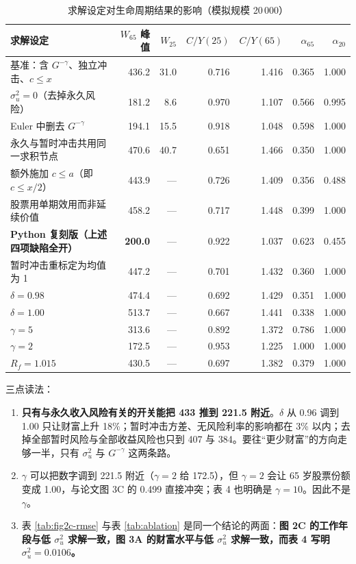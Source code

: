 \documentclass[UTF8,a4paper,11pt,fontset=fandol]{ctexart}
\newcommand{\su}{\sigma_u^2}
\begin{document}
\begin{table}[htbp]\centering\small
\caption{求解设定对生命周期结果的影响（模拟规模 20\,000）}\vspace{-2pt}
\begin{tabular}{@{}p{}rrrrrr@{}}\toprule
求解设定 & \(W_{65}\) 峰值 & \(W_{25}\) & \(C/Y(25)\) & \(C/Y(65)\) & \(\alpha_{65}\) & \(\alpha_{20}\)\\\midrule
基准：含 \(G^{-\gamma}\)、独立冲击、\(c\le x\) & 436.2 & 31.0 & 0.716 & 1.416 & 0.365 & 1.000\\
\(\su=0\)（去掉永久风险） & 181.2 & 8.6 & 0.970 & 1.107 & 0.566 & 0.995\\
Euler 中删去 \(G^{-\gamma}\) & 194.1 & 15.5 & 0.918 & 1.048 & 0.598 & 1.000\\
永久与暂时冲击共用同一求积节点 & 470.6 & 40.7 & 0.651 & 1.466 & 0.350 & 1.000\\
额外施加 \(c\le a\)（即 \(c\le x/2\)） & 443.9 & --- & 0.726 & 1.409 & 0.356 & 0.488\\
股票用单期效用而非延续价值 & 458.2 & --- & 0.717 & 1.448 & 0.399 & 1.000\\
\textbf{Python 复刻版（上述四项缺陷全开）} & \textbf{200.0} & --- & 0.922 & 1.037 & 0.623 & 0.455\\
暂时冲击重标定为均值为 1 & 447.2 & --- & 0.701 & 1.432 & 0.360 & 1.000\\
\(\delta=0.98\) & 474.4 & --- & 0.692 & 1.429 & 0.351 & 1.000\\
\(\delta=1.00\) & 513.7 & --- & 0.667 & 1.441 & 0.338 & 1.000\\
\(\gamma=5\) & 313.6 & --- & 0.892 & 1.372 & 0.786 & 1.000\\
\(\gamma=2\) & 172.5 & --- & 0.953 & 1.225 & 1.000 & 1.000\\
\(R_f=1.015\) & 430.5 & --- & 0.697 & 1.382 & 0.379 & 1.000\\\bottomrule
\end{tabular}
\end{table}

三点读法：
\begin{enumerate}[leftmargin=2.2em,itemsep=1pt]
\item \textbf{只有与永久收入风险有关的开关能把 433 推到 221.5 附近}。\(\delta\) 从 0.96 调到 1.00 只让财富上升 18\%；暂时冲击方差、无风险利率的影响都在 3\% 以内；去掉全部暂时风险与全部收益风险也只到 407 与 384。要往“更少财富”的方向走够一半，只有 \(\su\) 与 \(G^{-\gamma}\) 这两条路。
\item \(\gamma\) 可以把数字调到 221.5 附近（\(\gamma=2\) 给 172.5），但 \(\gamma=2\) 会让 65 岁股票份额变成 1.00，与论文图 3C 的 0.499 直接冲突；表 4 也明确是 \(\gamma=10\)。因此不是 \(\gamma\)。
\item 表 \ref{tab:fig2c-rmse} 与表 \ref{tab:ablation} 是同一个结论的两面：\textbf{图 2C 的工作年段与低 \(\su\) 求解一致，图 3A 的财富水平与低 \(\su\) 求解一致，而表 4 写明 \(\su=0.0106\)。}
\end{enumerate}
\end{document}
